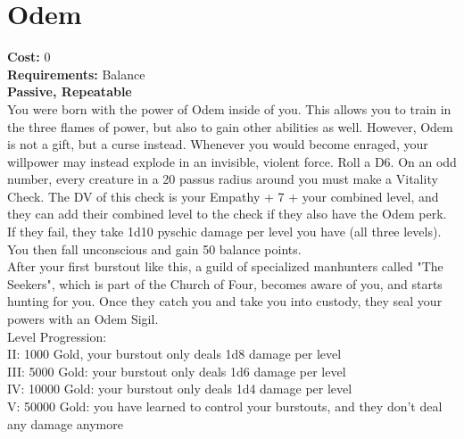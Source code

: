 \section*{Odem}
\textbf{Cost:} 0\\
\textbf{Requirements:} Balance\\
\textbf{Passive, Repeatable}\\
You were born with the power of Odem inside of you. This allows you to train in the three flames of power, but also to gain other abilities as well. However, Odem is not a gift, but a curse instead. Whenever you would become enraged, your willpower may instead explode in an invisible, violent force. Roll a D6. On an odd number, every creature in a 20 passus radius around you must make a Vitality Check. The DV of this check is your Empathy + 7 + your combined level, and they can add their combined level to the check if they also have the Odem perk. If they fail, they take 1d10 pyschic damage per level you have (all three levels). You then fall unconscious and gain 50 balance points.\\
After your first burstout like this, a guild of specialized manhunters called "The Seekers", which is part of the Church of Four, becomes aware of you, and starts hunting for you. Once they catch you and take you into custody, they seal your powers with an Odem Sigil.
\\
Level Progression:\\
II: 1000 Gold, your burstout only deals 1d8 damage per level\\
III: 5000 Gold: your burstout only deals 1d6 damage per level\\
IV: 10000 Gold: your burstout only deals 1d4 damage per level\\
V: 50000 Gold: you have learned to control your burstouts, and they don't deal any damage anymore\\